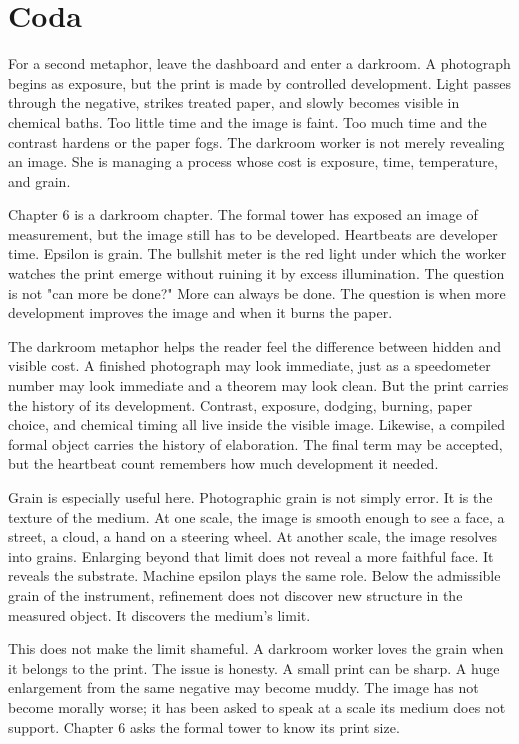 \section*{Coda}

For a second metaphor, leave the dashboard and enter a darkroom. A photograph
begins as exposure, but the print is made by controlled development. Light
passes through the negative, strikes treated paper, and slowly becomes visible
in chemical baths. Too little time and the image is faint. Too much time and
the contrast hardens or the paper fogs. The darkroom worker is not merely
revealing an image. She is managing a process whose cost is exposure, time,
temperature, and grain.

Chapter 6 is a darkroom chapter. The formal tower has exposed an image of
measurement, but the image still has to be developed. Heartbeats are developer
time. Epsilon is grain. The bullshit meter is the red light under which the
worker watches the print emerge without ruining it by excess illumination. The
question is not "can more be done?" More can always be done. The question is
when more development improves the image and when it burns the paper.

The darkroom metaphor helps the reader feel the difference between hidden and
visible cost. A finished photograph may look immediate, just as a speedometer
number may look immediate and a theorem may look clean. But the print carries
the history of its development. Contrast, exposure, dodging, burning, paper
choice, and chemical timing all live inside the visible image. Likewise, a
compiled formal object carries the history of elaboration. The final term may
be accepted, but the heartbeat count remembers how much development it needed.

Grain is especially useful here. Photographic grain is not simply error. It is
the texture of the medium. At one scale, the image is smooth enough to see a
face, a street, a cloud, a hand on a steering wheel. At another scale, the
image resolves into grains. Enlarging beyond that limit does not reveal a more
faithful face. It reveals the substrate. Machine epsilon plays the same role.
Below the admissible grain of the instrument, refinement does not discover new
structure in the measured object. It discovers the medium's limit.

This does not make the limit shameful. A darkroom worker loves the grain when
it belongs to the print. The issue is honesty. A small print can be sharp. A
huge enlargement from the same negative may become muddy. The image has not
become morally worse; it has been asked to speak at a scale its medium does not
support. Chapter 6 asks the formal tower to know its print size.

